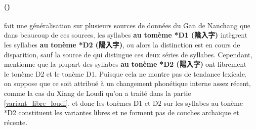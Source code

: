 \documentclass{scrbook}
\newcounter{c}[subsubsection]
\newcommand{\stpc}[1]{\stepcounter{#1}}
\newcommand{\difwenbai}{couches archaïque et récente\xspace}
\newcommand{\termyyx}[1]{\textbf{#1}}
\begin{document}
\begin{sloppypar}
\stpc{c}\paragraph{()}
\textcite[49]{Sagart1993gan} fait une généralisation sur plusieurs sources de données du Gan de Nanchang que dans beaucoup de ces sources, les syllabes \termyyx{au tomème *D1 (陰入字)} intègrent les syllabes \termyyx{au tonème *D2 (陽入字)}, ou alors la distinction est en cours de disparition, sauf la source de \textcite[189]{Xiong1989nanchang} qui distingue ces deux séries de syllabes. Cependant, \citeauthor{Xiong1989nanchang} mentionne que la plupart des syllabes \termyyx{au tonème *D2 (陽入字)} ont librement le tonème D2 et le tonème D1. Puisque cela ne montre pas de tendance lexicale, on suppose que ce soit attribué à un changement phonétique interne assez récent, comme la cas du Xiang de Loudi qu'on a traité dans la partie \ref{variant_libre_loudi}, et donc les tonèmes D1 et D2 sur les syllabes au tonème *D2 constituent les variantes libres et ne forment pas de \difwenbai.%


\end{sloppypar}
\end{document}

